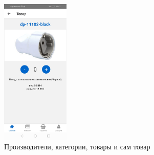 \begin{figure}[!p]
\begin{minipage}{0.24\textwidth}
        \includegraphics[height=7cm]
        {images/android/item.jpg}
    \end{minipage}

    \caption{Производители, категории, товары и сам товар}
    \label{fig:android_items}
\end{figure}

